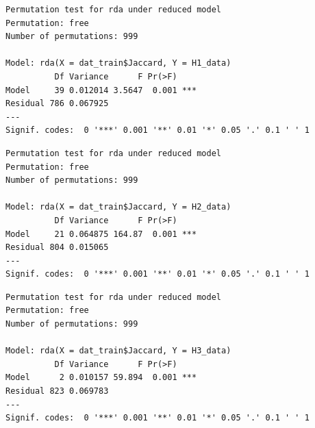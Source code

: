 \documentclass[
  letterpaper,
  DIV=11,
  numbers=noendperiod]{scrartcl}
\newenvironment{Shaded}{\begin{snugshade}}{\end{snugshade}}
\newcommand{\CommentTok}[1]{\textcolor[rgb]{0.37,0.37,0.37}{#1}}
\newcommand{\FunctionTok}[1]{\textcolor[rgb]{0.28,0.35,0.67}{#1}}
\newcommand{\NormalTok}[1]{\textcolor[rgb]{0.00,0.23,0.31}{#1}}
\newcommand{\SpecialCharTok}[1]{\textcolor[rgb]{0.37,0.37,0.37}{#1}}
\begin{document}
\begin{Shaded}
\end{Shaded}

\begin{verbatim}
Permutation test for rda under reduced model
Permutation: free
Number of permutations: 999

Model: rda(X = dat_train$Jaccard, Y = H1_data)
          Df Variance      F Pr(>F)    
Model     39 0.012014 3.5647  0.001 ***
Residual 786 0.067925                  
---
Signif. codes:  0 '***' 0.001 '**' 0.01 '*' 0.05 '.' 0.1 ' ' 1
\end{verbatim}

\begin{Shaded}
\end{Shaded}

\begin{verbatim}
Permutation test for rda under reduced model
Permutation: free
Number of permutations: 999

Model: rda(X = dat_train$Jaccard, Y = H2_data)
          Df Variance      F Pr(>F)    
Model     21 0.064875 164.87  0.001 ***
Residual 804 0.015065                  
---
Signif. codes:  0 '***' 0.001 '**' 0.01 '*' 0.05 '.' 0.1 ' ' 1
\end{verbatim}

\begin{Shaded}
\end{Shaded}

\begin{verbatim}
Permutation test for rda under reduced model
Permutation: free
Number of permutations: 999

Model: rda(X = dat_train$Jaccard, Y = H3_data)
          Df Variance      F Pr(>F)    
Model      2 0.010157 59.894  0.001 ***
Residual 823 0.069783                  
---
Signif. codes:  0 '***' 0.001 '**' 0.01 '*' 0.05 '.' 0.1 ' ' 1
\end{verbatim}
\end{document}
